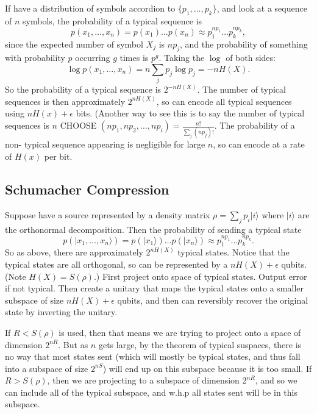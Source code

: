 \documentclass[12pt]{article}
\begin{document}
If have a distribution of symbols accordion to $\{p_1,\dots,p_k\}$, and look at a sequence of $n$ symbols, the probability of a typical sequence is
$$p(x_1,\dots,x_n)=p(x_1)\dots p(x_n)\approx p_1^{np_1}\dots p_k^{np_k},$$
since the expected number of symbol $X_j$ is $np_j$, and the probability of something with probability $p$ occurring $g$ times is $p^g$.
Taking the $\log$ of both sides:
$$\log p(x_1,\dots,x_n)=n\sum_jp_j\log p_j=-nH(X).$$
So the probability of a typical sequence is $2^{-nH(X)}$. The number of typical sequences is then approximately $2^{nH(X)}$, so can encode
all typical sequences using $nH(x)+\epsilon$ bits. (Another way to see this is to say the number of typical sequences is 
$n$ CHOOSE $(np_1,np_2,\dots,np_i)=\frac{n!}{\sum_j(np_j)!}$. The probability of a non-
typical sequence appearing is negligible for large $n$, so can encode at a rate of $H(x)$ per bit.

\subsection{Schumacher Compression}
Suppose have a source represented by a density matrix $\rho=\sum_jp_i|i\rangle$ where $|i\rangle$ are the orthonormal decomposition. Then the probability of 
sending a typical state
$$p(|x_1,\dots,x_n\rangle)=p(|x_1\rangle)\dots p(|x_n\rangle)\approx p_1^{np_1}\dots p_k^{np_k}.$$
So as above, there are approximately $2^{nH(X)}$ typical states. Notice that the typical states are all orthogonal, so can be represented by a
$nH(X)+\epsilon$ qubits. (Note $H(X)=S(\rho)$.) First project onto space of typical states. Output error if not typical. Then create a unitary that maps the typical states onto a smaller subspace of size $nH(X)+\epsilon$ qubits, and then can reversibly 
recover the original state by inverting the unitary.

If $R<S(\rho)$ is used, then that means we are trying to project onto a space of dimension $2^{nR}$. But as $n$ gets large, by the theorem of typical suspaces, there is no way that most states sent (which will mostly be typical states, and thus fall into a subspace of size $2^{nS}$) will
end up on this subspace because it is too small. If $R>S(\rho)$, then we are projecting to a subspace of dimension $2^{nR}$, and so we can include all of the typical subspace, and w.h.p all states sent will be in this subspace. 
\end{document}
